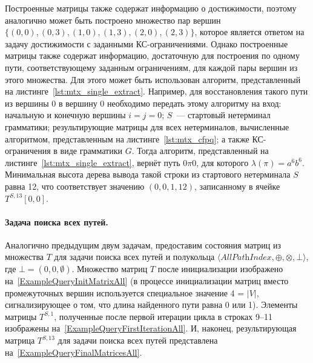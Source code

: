 Построенные матрицы также содержат информацию о достижимости, поэтому аналогично может быть построено множество пар вершин $\{(0, 0), (0, 3), (1, 0), (1, 3), (2, 0), (2, 3)\}$, которое является ответом на задачу достижимости с заданными КС-ограничениями. Однако построенные матрицы также содержат информацию, достаточную для построения по одному пути, соответствующему заданным ограничениям, для каждой пары вершин из этого множества. Для этого может быть использован алгоритм, представленный на листинге~\ref{lst:mtx_single_extract}. Например, для восстановления такого пути из вершины 0 в вершину 0 необходимо передать этому алгоритму на вход: начальную и конечную вершины $i = j = 0$; $S$~--- стартовый нетерминал грамматики; результирующие матрицы для всех нетерминалов, вычисленные алгоритмом, представленным на листинге~\ref{lst:mtx_cfpq}; а также КС-ограничения в виде грамматики $G$. Тогда алгоритм, представленный на листинге~\ref{lst:mtx_single_extract}, вернёт путь $0\pi 0$, для которого $\lambda(\pi) = a^6 b^6$. Минимальная высота дерева вывода такой строки из стартового нетерминала $S$ равна 12, что соответствует значению $(0, 0, 1, 12)$, записанному в ячейке $T^{S, 13}[0, 0]$.


\paragraph{Задача поиска всех путей.} Аналогично предыдущим двум задачам, предоставим состояния матриц из множества $T$ для задачи поиска всех путей и полукольца $\langle \textit{AllPathIndex}, \oplus, \otimes, \bot \rangle$, где $\bot = (0, 0, \emptyset)$. Множество матриц $T$ после инициализации изображено на~\cref{ExampleQueryInitMatrixAll} (в процессе инициализации матриц вместо промежуточных вершин используется специальное значение 4 = $|V|$, сигнализирующее о том, что длина найденного пути равна 0 или 1). Элементы матрицы $T^{S, 1}$, полученные после первой итерации цикла в строках 9--11 изображены на~\cref{ExampleQueryFirstIterationAll}. И, наконец, результирующая матрица $T^{S, 13}$ для задачи поиска всех путей представлена на~\cref{ExampleQueryFinalMatricesAll}.

